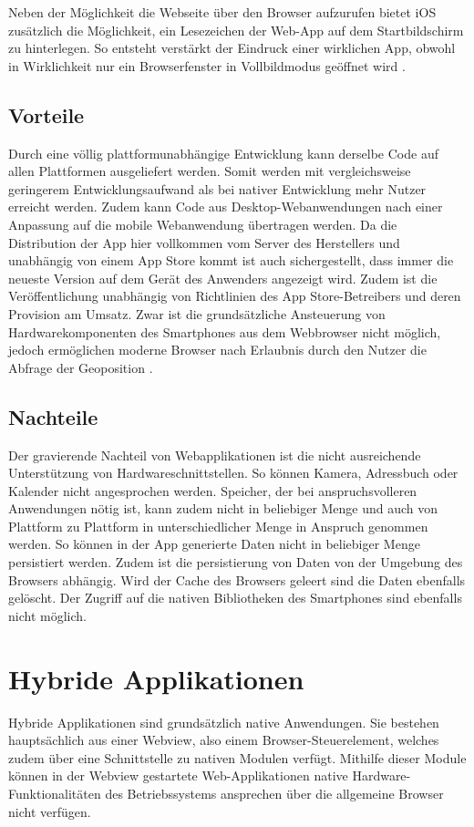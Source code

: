 Neben der Möglichkeit die Webseite über den Browser aufzurufen bietet iOS zusätzlich die Möglichkeit, ein Lesezeichen der Web-App auf dem Startbildschirm zu hinterlegen. So entsteht verstärkt der Eindruck einer wirklichen App, obwohl in Wirklichkeit nur ein Browserfenster in Vollbildmodus geöffnet wird \cite{safariRef}.
%
\subsection{Vorteile}
%
Durch eine völlig plattformunabhängige Entwicklung kann derselbe Code auf allen Plattformen ausgeliefert werden. Somit werden mit vergleichsweise geringerem Entwicklungsaufwand als bei nativer Entwicklung mehr Nutzer erreicht werden. Zudem kann Code aus Desktop-Webanwendungen nach einer Anpassung auf die mobile Webanwendung übertragen werden. Da die Distribution der App hier vollkommen vom Server des Herstellers und unabhängig von einem App Store kommt ist auch sichergestellt, dass immer die neueste Version auf dem Gerät des Anwenders angezeigt wird. Zudem ist die Veröffentlichung unabhängig von Richtlinien des App Store-Betreibers und deren Provision am Umsatz. Zwar ist die grundsätzliche Ansteuerung von Hardwarekomponenten des Smartphones aus dem Webbrowser nicht möglich, jedoch ermöglichen moderne Browser nach Erlaubnis durch den Nutzer die Abfrage der Geoposition \cite{browserGPS}.
%
\subsection{Nachteile}
%
Der gravierende Nachteil von Webapplikationen ist die nicht ausreichende Unterstützung von Hardwareschnittstellen. So können Kamera, Adressbuch oder Kalender nicht angesprochen werden. Speicher, der bei anspruchsvolleren Anwendungen nötig ist, kann zudem nicht in beliebiger Menge und auch von Plattform zu Plattform in unterschiedlicher Menge in Anspruch genommen werden. So können in der App generierte Daten nicht in beliebiger Menge persistiert werden. Zudem ist die persistierung von Daten von der Umgebung des Browsers abhängig. Wird der Cache des Browsers geleert sind die Daten ebenfalls gelöscht. Der Zugriff auf die nativen Bibliotheken des Smartphones sind ebenfalls nicht möglich.
%
%
\section{Hybride Applikationen}
\label{sec:HybrideApplikationen}
%
Hybride Applikationen sind grundsätzlich native Anwendungen. Sie bestehen hauptsächlich aus einer Webview, also einem Browser-Steuerelement, welches zudem über eine Schnittstelle zu nativen Modulen verfügt. Mithilfe dieser Module können in der Webview gestartete Web-Applikationen native Hardware-Funktionalitäten des Betriebssystems ansprechen über die allgemeine Browser nicht verfügen.

